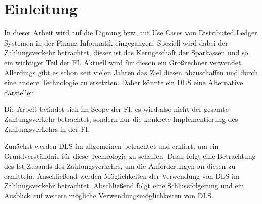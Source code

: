 
\noindent %

\section{Einleitung}

In dieser Arbeit wird auf die Eignung bzw. auf Use Cases von Distributed Ledger Systemen in der Finanz Informatik eingegangen.
Speziell wird dabei der Zahlungsverkehr betrachtet, dieser ist das Kerngeschäft der Sparkassen und so ein wichtiger Teil der FI.
Aktuell wird für diesen ein Großrechner verwendet.
Allerdings gibt es schon seit vielen Jahren das Ziel diesen abzuschaffen und durch eine andere Technologie zu ersetzten.
Daher könnte ein DLS eine Alternative darstellen.

\noindent
Die Arbeit befindet sich im Scope der FI, es wird also nicht der gesamte Zahlungsverkehr betrachtet, sondern nur die konkrete Implementierung des Zahlungsverkehrs in der FI.

\noindent
Zunächst werden DLS im allgemeinen betrachtet und erklärt, um ein Grundverständnis für diese Technologie zu schaffen.
Dann folgt eine Betrachtung des Ist-Zusands des Zahlungsverkehrs, um die Anforderungen an diesen zu ermitteln.
Anschließend werden Möglichkeiten der Verwendung von DLS im Zahlungsverkehr betrachtet.
Abschließend folgt eine Schlussfolgerung und ein Ausblick auf weitere mögliche Verwendungsmöglichkeiten von DLS.